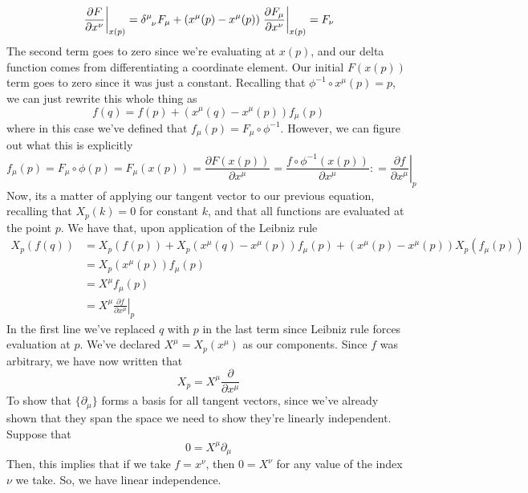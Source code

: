 \documentclass[11pt, a4paper]{article}   	%
\theoremstyle{slplain}
\begin{document}
\[ 
\left. \frac{ \partial F}{ \partial x^\nu } \right\vert_{ x(p)}  = \delta\indices{^\mu_\nu} F_\mu + (x^\mu (p)  - x^\mu( p) ) \left. \frac{ \partial F_\mu}{ \partial x^\nu } \right\vert_{ x( p)}  = F_\nu \] 
The second term goes to zero since we're evaluating at $x(p)$, and our delta function comes from differentiating a coordinate element. Our initial $F(x(p))$ term goes to zero since it was just a constant. Recalling that $\phi^{ -1} \circ x^\mu ( p )  = p$, we can just rewrite this whole thing as 
\[ 
f(q) = f(p) + (x^\mu (q) - x^\mu ( p)) f_\mu (p ) 
\] 
where in this case we've defined that $f_\mu (p ) = F_\mu \circ \phi^{ - 1} $. However, we can figure out what this is explicitly
\[ 
f_\mu ( p ) = F_\mu \circ \phi ( p )  = F_\mu ( x(p)) =  \frac{\partial F (x(p)) }{ \partial x^\mu } = \frac{ f \circ \phi^{ -1 } ( x (p))}{ \partial x^\mu } : = \left. \frac{ \partial f}{ \partial x^\mu } \right\vert_{ p } 
\] 
Now, its a matter of applying our tangent vector to our previous equation, recalling that $X_p (k ) = 0 $ for constant $k$, and that all functions are evaluated at the point $ p$. We have that, upon application of the Leibniz rule 
\begin{align*} 
X_p ( f(q)) & = X_p ( f(p)) + X_p ( x^\mu (q) - x^\mu (p) ) f_\mu (p) + ( x^\mu (p) - x^\mu(p) )X_p ( f_\mu ( p)) \\
& = X_p ( x^\mu (p)) f_\mu ( p) \\
&= X^\mu f_\mu ( p) \\
&= X^\mu \left. \frac{ \partial f }{ \partial x^\mu } \right\vert_p 
\end{align*} 
In the first line we've replaced $q$ with $p$ in the last term since Leibniz rule forces evaluation at $p$. We've declared $X^\mu = X_p (x^\mu) $ as our components. Since $f$ was arbitrary, we have now written that 
\[ 
X_p = X^\mu \frac{ \partial }{ \partial x^\mu } 
\] 
To show that $\{ \partial_\mu \} $ forms a basis for all tangent vectors, since we've already shown that they span the space we need to show they're linearly independent. Suppose that 
\[ 
0 = X^\mu \partial_\mu
\] 
Then, this implies that if we take $f = x^\nu$, then $0 = X^\nu$ for any value of the index $\nu$ we take. So, we have linear independence.   
\end{document}
